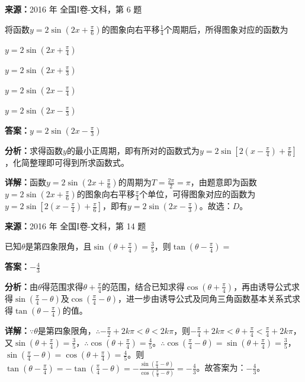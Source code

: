 \begin{question}[points=5]
\textbf{来源：}2016 年 全国I卷-文科，第 6 题\par
将函数$y=2\sin(2x+\frac{\pi}{6})$的图象向右平移$\frac{1}{4}$个周期后，所得图象对应的函数为
\begin{choices}
  \item $y=2\sin(2x+\frac{\pi}{4})$
  \item $y=2\sin(2x+\frac{\pi}{3})$
  \item $y=2\sin(2x-\frac{\pi}{4})$
  \item $y=2\sin(2x-\frac{\pi}{3})$
\end{choices}
\begin{solution}
\textbf{答案：}$y=2\sin(2x-\frac{\pi}{3})$

\textbf{分析：}求得函数$y$的最小正周期，即有所对的函数式为$y=2\sin[2(x-\frac{\pi}{4})+\frac{\pi}{6}]$，化简整理即可得到所求函数式。

\textbf{详解：}函数$y=2\sin(2x+\frac{\pi}{6})$的周期为$T=\frac{2\pi}{2}=\pi$，由题意即为函数$y=2\sin(2x+\frac{\pi}{6})$的图象向右平移$\frac{\pi}{4}$个单位，可得图象对应的函数为$y=2\sin[2(x-\frac{\pi}{4})+\frac{\pi}{6}]$，即有$y=2\sin(2x-\frac{\pi}{3})$。故选：$D$。
\end{solution}
\end{question}

\begin{question}[points=5]
\textbf{来源：}2016 年 全国I卷-文科，第 14 题\par
已知$\theta$是第四象限角，且$\sin(\theta+\frac{\pi}{4})=\frac{3}{5}$，则$\tan(\theta-\frac{\pi}{4})=$
\fillin[{$-\frac{4}{3}$}]
\begin{solution}
\textbf{答案：}$-\frac{4}{3}$

\textbf{分析：}由$\theta$得范围求得$\theta+\frac{\pi}{4}$的范围，结合已知求得$\cos(\theta+\frac{\pi}{4})$，再由诱导公式求得$\sin(\frac{\pi}{4}-\theta)$及$\cos(\frac{\pi}{4}-\theta)$，进一步由诱导公式及同角三角函数基本关系式求得$\tan(\theta-\frac{\pi}{4})$的值。

\textbf{详解：}$\because\theta$是第四象限角，$\therefore -\frac{\pi}{2}+2k\pi<\theta<2k\pi$，则$-\frac{\pi}{4}+2k\pi<\theta+\frac{\pi}{4}<\frac{\pi}{4}+2k\pi$，又$\sin(\theta+\frac{\pi}{4})=\frac{3}{5}$，$\therefore\cos(\theta+\frac{\pi}{4})=\frac{4}{5}$。$\therefore\cos(\frac{\pi}{4}-\theta)=\sin(\theta+\frac{\pi}{4})=\frac{3}{5}$，$\sin(\frac{\pi}{4}-\theta)=\cos(\theta+\frac{\pi}{4})=\frac{4}{5}$。则$\tan(\theta-\frac{\pi}{4})=-\tan(\frac{\pi}{4}-\theta)=-\frac{\sin(\frac{\pi}{4}-\theta)}{\cos(\frac{\pi}{4}-\theta)}=-\frac{4}{3}$。故答案为：$-\frac{4}{3}$。
\end{solution}
\end{question}

